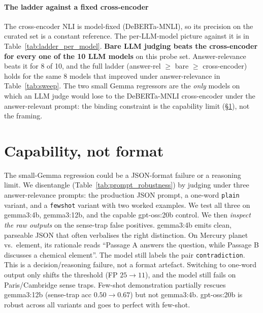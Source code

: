 \documentclass[sigconf, nonacm, natbib]{acmart}
\begin{document}


\paragraph{The ladder against a fixed cross-encoder}
The cross-encoder NLI is model-fixed (DeBERTa-MNLI), so its precision on the curated set
is a constant reference. The per-LLM-model picture against it is in
Table~\ref{tab:ladder_per_model}. \textbf{Bare LLM judging beats the cross-encoder for
every one of the 10 LLM models} on this probe set. Answer-relevance beats it for 8 of
10, and the full ladder (answer-rel $\geq$ bare $\geq$ cross-encoder) holds for the
same 8 models that improved under answer-relevance in Table~\ref{tab:sweep}. The two
small Gemma regressors are the \emph{only} models on which an LLM judge would lose to
the DeBERTa-MNLI cross-encoder under the answer-relevant prompt: the binding constraint
is the capability limit (\S\ref{sec:promptrob}), not the framing.



\section{Capability, not format}
\label{sec:promptrob}
The small-Gemma regression could be a JSON-format failure or a reasoning limit. We
disentangle (Table~\ref{tab:prompt_robustness}) by judging under three answer-relevance
prompts: the production JSON prompt, a one-word \texttt{plain} variant, and a
\texttt{fewshot} variant with two worked examples. We test all three on gemma3:4b,
gemma3:12b, and the capable gpt-oss:20b control. We then \emph{inspect the raw outputs}
on the sense-trap false positives. gemma3:4b emits clean, parseable JSON that often
verbalises the right distinction. On Mercury planet vs.~element, its rationale reads
``Passage A answers the question, while Passage B discusses a chemical element''. The
model still labels the pair \texttt{contradiction}. This is a decision/reasoning
failure, not a format artefact. Switching to one-word output only shifts the threshold
(FP $25 \to 11$), and the model still fails on Paris/Cambridge sense traps. Few-shot
demonstration partially rescues gemma3:12b (sense-trap acc $0.50 \to 0.67$) but not
gemma3:4b. gpt-oss:20b is robust across all variants and goes to perfect with few-shot.


\end{document}
